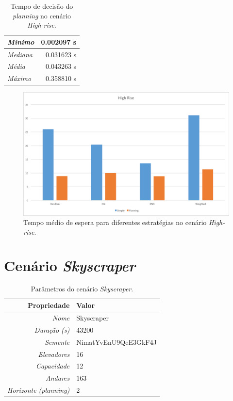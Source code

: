 \begin{table}[htb]
\centering
\caption{Tempo de decisão do \textit{planning} no cenário \textit{High-rise}.}
\label{table:results:highrise:time}
\begin{tabular}{|l|r|}
\hline
\textit{Mínimo}  & 0.002097 s \\ \hline
\textit{Mediana} & 0.031623 s \\ \hline
\textit{Média}   & 0.043263 s \\ \hline
\textit{Máximo}  & 0.358810 s \\ \hline
\end{tabular}
\end{table}

\begin{figure}[htb]
  \centering
  \includegraphics[scale=0.5]{img/chart-averages-high-rise}
  \caption[Tempo médio de espera no cenário \textit{High-rise}.]{Tempo médio de espera para diferentes estratégias no cenário \textit{High-rise}.}
  \label{fig:result:average:high-rise}
\end{figure}

\section{Cenário \textit{Skyscraper}}

\lipsum[1]

\begin{table}[htb!]
\centering
\caption{Parâmetros do cenário \textit{Skyscraper}.}
\label{tab:results:skyscraper:params}
\begin{tabular}{|r|l|}
\hline
\textbf{Propriedade}          & \textbf{Valor}       \\ \hline
\textit{Nome}                 & Skyscraper           \\ \hline
\textit{Duração (s)}          & 43200                \\ \hline
\textit{Semente}              & NimatYvEnU9QeE3GkF4J \\ \hline
\textit{Elevadores}           & 16                   \\ \hline
\textit{Capacidade}           & 12                   \\ \hline
\textit{Andares}              & 163                  \\ \hline
\textit{Horizonte (planning)} & 2                    \\ \hline
\end{tabular}
\end{table}

